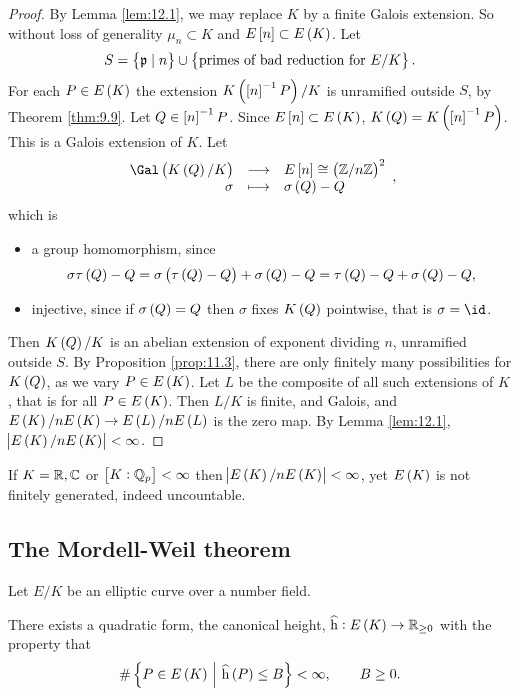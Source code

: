 \begin{proof}
By Lemma \ref{lem:12.1}, we may replace $ K $ by a finite Galois extension. So without loss of generality $ \mu_n \subset K $ and $ E\sbr{n} \subset E\br{K} $. Let
$$ S = \cbr{\ppp \mid n} \cup \cbr{\text{primes of bad reduction for} \ E / K}. $$
For each $ P \in E\br{K} $ the extension $ K\br{\sbr{n}^{-1}P} / K $ is unramified outside $ S $, by Theorem \ref{thm:9.9}. Let $ Q \in \sbr{n}^{-1}P $. Since $ E\sbr{n} \subset E\br{K} $, $ K\br{Q} = K\br{\sbr{n}^{-1}P} $. This is a Galois extension of $ K $. Let
$$ \function{\Gal\br{K\br{Q} / K}}{E\sbr{n} \cong \br{\ZZ / n\ZZ}^2}{\sigma}{\sigma\br{Q} - Q}, $$
which is
\begin{itemize}
\item a group homomorphism, since
$$ \sigma\tau\br{Q} - Q = \sigma\br{\tau\br{Q} - Q} + \sigma\br{Q} - Q = \tau\br{Q} - Q + \sigma\br{Q} - Q, $$
\item injective, since if $ \sigma\br{Q} = Q $ then $ \sigma $ fixes $ K\br{Q} $ pointwise, that is $ \sigma = \id $.
\end{itemize}
Then $ K\br{Q} / K $ is an abelian extension of exponent dividing $ n $, unramified outside $ S $. By Proposition \ref{prop:11.3}, there are only finitely many possibilities for $ K\br{Q} $, as we vary $ P \in E\br{K} $. Let $ L $ be the composite of all such extensions of $ K $, that is for all $ P \in E\br{K} $. Then $ L / K $ is finite, and Galois, and $ E\br{K} / nE\br{K} \to E\br{L} / nE\br{L} $ is the zero map. By Lemma \ref{lem:12.1}, $ \abs{E\br{K} / nE\br{K}} < \infty $.
\end{proof}

\begin{remark*}
If $ K = \mathbb{R}, \mathbb{C} $ or $ \sbr{K : \QQ_p} < \infty $ then $ \abs{E\br{K} / nE\br{K}} < \infty $, yet $ E\br{K} $ is not finitely generated, indeed uncountable.
\end{remark*}

\pagebreak

\subsection{The Mordell-Weil theorem}

Let $ E / K $ be an elliptic curve over a number field.

\begin{fact*}
There exists a quadratic form, the canonical height, $ \widehat{\h} : E\br{K} \to \RR_{\ge 0} $ with the property that
\begin{equation}
\label{eq:13}
\#\cbr{P \in E\br{K} \st \widehat{\h}\br{P} \le B} < \infty, \qquad B \ge 0.
\end{equation}
\end{fact*}

